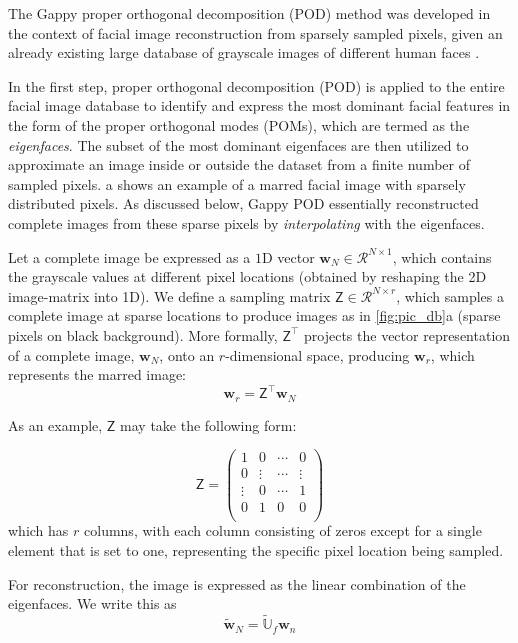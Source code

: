 \documentclass[11pt]{article}
\renewcommand{\vec}[1]{\mathbf{#1}}
\newcommand{\mat}[1]{\mathsf{#1}}
\begin{document}
The Gappy proper orthogonal decomposition (POD) method was developed in the context of facial image reconstruction from sparsely sampled pixels, given an already existing large database of grayscale images of different human faces \cite{sirovich1987low-dimensional}.


In the first step, proper orthogonal decomposition (POD) is applied to the entire facial image database to identify and express the most dominant facial features in the form of the proper orthogonal modes (POMs), which are termed as the \textit{eigenfaces}.
The subset of the most dominant eigenfaces are then utilized to approximate an image inside or outside  the dataset from a finite number of sampled pixels.
a shows an example of a marred facial image with sparsely distributed pixels.
As discussed below, Gappy POD essentially reconstructed complete images from these sparse pixels by \textit{interpolating} with the eigenfaces.


Let a complete image be expressed as a $1$D vector $\vec{w}_N\in \mathcal{R}^{N\times 1}$, which contains the grayscale values at different pixel locations (obtained by reshaping the 2D image-matrix into 1D).
We define a sampling matrix $\mat{Z}\in \mathcal{R}^{N\times r}$, which samples a complete image at sparse locations to produce images as in \cref{fig:pic_db}a (sparse pixels on black background).
More formally, $\mat{Z}^{\top}$ projects the vector representation of a complete image, $\vec{w}_N$, onto an $r$-dimensional space, producing $\vec{w}_r$, which represents the marred image:
\begin{equation}
{\vec{w}}_r = \mat{Z}^{\top} \vec{w}_N
\end{equation}

As an example, $\mat{Z}$ may take the following form:

\begin{equation}
\mat{Z} =  
\begin{pmatrix}
1 & 0 & \cdots & 0\\
0 &  \vdots & \cdots &  \vdots \\
\vdots &  0 & \cdots &  1 \\
0 &  1 & 0 &  0 \\
\end{pmatrix}
\end{equation}
which has $r$ columns, with each column consisting of zeros except for a single element that is set to one, representing the specific pixel location being sampled.


For reconstruction, the image is expressed as the linear combination of the eigenfaces.
We write this as
\begin{equation}
\widetilde{\vec{w}}_N = \widetilde{\mathbb{U}}_f\vec{w}_n
\label{eq:rec_imag}
\end{equation}
\end{document}
